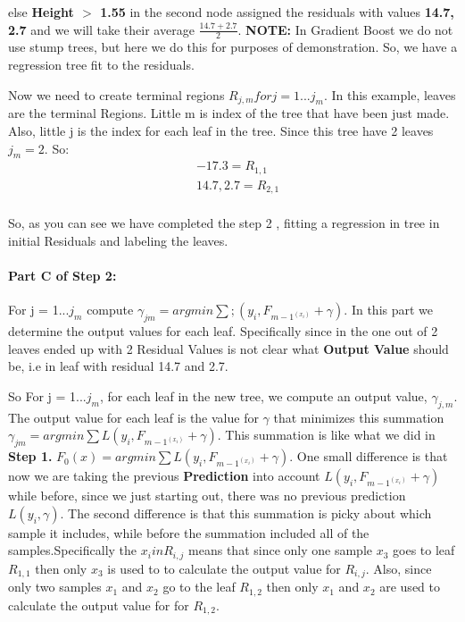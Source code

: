 \documentclass[12pt, a4paper]{article} %
\begin{document}
else \textbf{Height $>$ 1.55} in the second node assigned the residuals with values \textbf{14.7, 2.7} and we will take their average $\frac{14.7 + 2.7}{2}$. \textbf{NOTE:} In Gradient Boost we do not use stump trees, but here we do this for purposes of demonstration. So, we have a regression tree fit to the residuals.

Now we need to create terminal regions $R_{j, m} for j = 1...j_{m}$. In this example, leaves are the terminal Regions. Little m is index of the tree that have been just made. Also, little j is the index for each leaf in the tree. Since this tree have 2 leaves $j_{m} = 2$. So:
\begin{align*}
    & -17.3 = R_{1, 1}\\
    & 14.7, 2.7 = R_{2, 1}\\
\end{align*}

So, as you can see we have completed the step 2 , fitting a regression in tree in initial Residuals and labeling the leaves.

\paragraph{Part C of Step 2:} For j = 1...$j_{m}$ compute $\gamma_{jm} = argmin \sum ;(y_{i}, F_{m - 1^(x_{i})} + \gamma)$. In this part we determine the output values for each leaf. Specifically since in the one out of 2 leaves ended up with 2 Residual Values is not clear what \textbf{Output Value} should be, i.e in leaf with residual 14.7 and 2.7.

So For j = 1...$j_{m}$, for each leaf in the new tree, we compute an output value, $\gamma_{j, m}$. The output value for each leaf is the value for $\gamma$ that minimizes this summation $\gamma_{jm} = argmin \sum L(y_{i}, F_{m - 1^(x_{i})} + \gamma)$. This summation is like what we did in \textbf{Step 1.} $F_{0}(x) = argmin \sum L(y_{i}, F_{m - 1^(x_{i})} + \gamma)$. One small difference is that now we are taking the previous \textbf{Prediction} into account $L(y_{i}, F_{m - 1^(x_{i})} + \gamma)$ while before, since we just starting out, there was no previous prediction $L(y_{i}, \gamma)$. The second difference is that this summation is picky about which sample it includes, while before the summation included all of the samples.Specifically the $x_{i} in R_{i, j}$ means that since only one sample $x_{3}$ goes to leaf $R_{1, 1}$ then only $x_{3}$ is used to to calculate the output value for $R_{i, j}$. Also, since only two samples $x_{1}$ and $x_{2}$ go to the leaf $R_{1, 2}$ then only $x_{1}$ and $x_{2}$ are used to calculate the output value for for $R_{1, 2}$.
\end{document}

